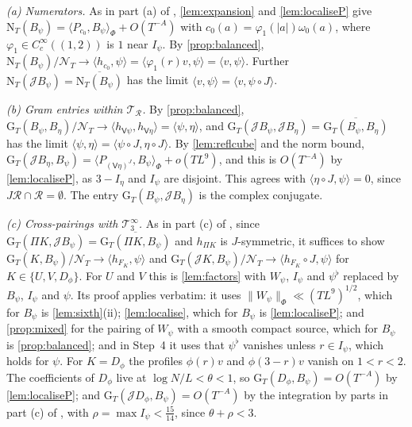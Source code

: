 \documentclass[11pt,colorlinks]{charlie}
\newcommand{\ip}[2]{\langle #1,#2\rangle}
\begin{document}
\emph{(a) Numerators.} As in part (a) of , \cref{lem:expansion} and \cref{lem:localiseP} give $\mathrm N_T(B_\psi)=\ip{P_{c_0}}{B_\psi}_\Phi+O(T^{-A})$ with $c_0(a)=\varphi_1(|a|)\omega_0(a)$, where $\varphi_1\in C_c^\infty((1,2))$ is $1$ near $I_\psi$. By \cref{prop:balanced}, $\mathrm N_T(B_\psi)/\mathcal N_T\to\ip{h_{c_0}}{\psi}=\ip{\varphi_1(r)v}\psi=\ip v\psi$. Further $\mathrm N_T(\mathcal JB_\psi)=\overline{\mathrm N_T(B_\psi)}$ has the limit $\ip v\psi=\ip v{\psi\circ J}$.

\emph{(b) Gram entries within $\mathcal T_{\mathcal R}$.} By \cref{prop:balanced}, $\mathrm G_T(B_\psi,B_\eta)/\mathcal N_T\to\ip{h_{\mathsf V\psi}}{h_{\mathsf V\eta}}=\ip\psi\eta$, and $\mathrm G_T(\mathcal JB_\psi,\mathcal JB_\eta)=\overline{\mathrm G_T(B_\psi,B_\eta)}$ has the limit $\ip\psi\eta=\ip{\psi\circ J}{\eta\circ J}$. By \cref{lem:reflcube} and the norm bound, $\mathrm G_T(\mathcal JB_\eta,B_\psi)=\ip{P_{(\mathsf V\eta)^J}}{B_\psi}_\Phi+o(TL^9)$, and this is $O(T^{-A})$ by \cref{lem:localiseP}, as $3-I_\eta$ and $I_\psi$ are disjoint. This agrees with $\ip{\eta\circ J}\psi=0$, since $J\mathcal R\cap\mathcal R=\emptyset$. The entry $\mathrm G_T(B_\psi,\mathcal JB_\eta)$ is the complex conjugate.

\emph{(c) Cross-pairings with $\mathcal T_3^\infty$.} As in part (c) of , since $\mathrm G_T(\Pi K,\mathcal JB_\psi)=\overline{\mathrm G_T(\Pi K,B_\psi)}$ and $h_{\Pi K}$ is $J$-symmetric, it suffices to show $\mathrm G_T(K,B_\psi)/\mathcal N_T\to\ip{h_{F_K}}\psi$ and $\mathrm G_T(\mathcal JK,B_\psi)/\mathcal N_T\to\ip{h_{F_K}\circ J}\psi$ for $K\in\{U,V,D_\phi\}$. For $U$ and $V$ this is \cref{lem:factors} with $W_\psi$, $I_\psi$ and $\psi^\flat$ replaced by $B_\psi$, $I_\psi$ and $\psi$. Its proof applies verbatim: it uses $\|W_\psi\|_\Phi\ll(TL^9)^{1/2}$, which for $B_\psi$ is \cref{lem:sixth}(ii); \cref{lem:localise}, which for $B_\psi$ is \cref{lem:localiseP}; and \cref{prop:mixed} for the pairing of $W_\psi$ with a smooth compact source, which for $B_\psi$ is \cref{prop:balanced}; and in Step~4 it uses that $\psi^\flat$ vanishes unless $r\in I_\psi$, which holds for $\psi$. For $K=D_\phi$ the profiles $\phi(r)v$ and $\phi(3-r)v$ vanish on $1<r<2$. The coefficients of $D_\phi$ live at $\log N/L<\theta<1$, so $\mathrm G_T(D_\phi,B_\psi)=O(T^{-A})$ by \cref{lem:localiseP}; and $\mathrm G_T(\mathcal JD_\phi,B_\psi)=O(T^{-A})$ by the integration by parts in part (c) of , with $\rho=\max I_\psi<\frac{15}{14}$, since $\theta+\rho<3$.
\end{document}
